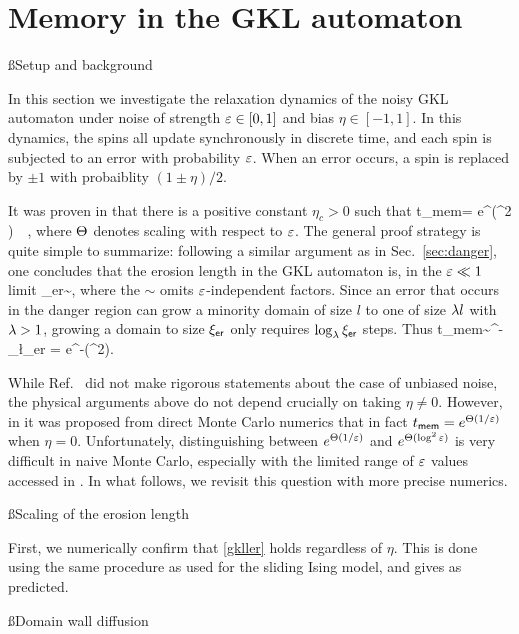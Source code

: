 \documentclass[12pt]{article}
\newcommand{\ler}{\ell_{\sf er}}
\newcommand{\tmem}{t_{\sf mem}}
\renewcommand{\ler}{{\xi_{\sf er}}}
\begin{document}
\section{Memory in the GKL automaton}

\ss{Setup and background}

In this section we investigate the relaxation dynamics of the noisy GKL automaton \cite{gacs1978one} under noise of strength $\varepsilon \in [0,1]$ and bias $\eta \in [-1,1]$. In this dynamics, the spins all update synchronously in discrete time, and each spin is subjected to an error with probability $\varepsilon$. When an error occurs, a spin is replaced by $\pm1$ with probaiblity $(1\pm \eta)/2$.

It was proven in \cite{park1997ergodicity} that there is a positive constant $\eta_c>0$ such that 
\be \tmem = e^{\ct(\log^2 \ep)} \qq \forall \, \,\eta \in [-1, -\eta_c] \cup [\eta_c , 1],\ee 
where $\Theta$ denotes scaling with respect to $\varepsilon$. The general proof strategy is quite simple to summarize: following a similar argument as in Sec.~\ref{sec:danger}, one concludes that the erosion length in the GKL automaton is, in the $\varepsilon\ll1$ limit 
\be \label{gkller} \ler \sim {},\ee 
where the $\sim$ omits $\varepsilon$-independent factors. 
Since an error that occurs in the danger region can grow a minority domain of size $l$ to one of size $\lambda l$ with $\lambda > 1$, growing a domain to size $\ler$ only requires $\log_\l \ler$ steps. Thus 
\be \label{gkl_tmem} \tmem \sim \ep^{-\log_\l \ler} = e^{-\ct(\log ^2\ep)}.\ee 

While Ref.~\cite{park1997ergodicity} did not make rigorous statements about the case of unbiased noise, the physical arguments above do not depend crucially on taking $\eta \neq 0$. However, in \cite{de1992gacs} it was proposed from direct Monte Carlo numerics that in fact $\tmem = e^{\ct(1/\ep)}$ when $\eta = 0$. Unfortunately, distinguishing between $e^{\Theta(1/\varepsilon)}$ and $e^{\Theta( \log^2 \varepsilon)}$ is very difficult in naive Monte Carlo, especially with the limited range of $\varepsilon$ values accessed in \cite{de1992gacs}. In what follows, we revisit this question with more precise numerics. 

\ss{Scaling of the erosion length} 

First, we numerically confirm that \eqref{gkller} holds regardless of $\eta$. This is done using the same procedure as used for the sliding Ising model, and gives 
\be {} \ee 
as predicted. 

\ss{Domain wall diffusion} 
\end{document}
